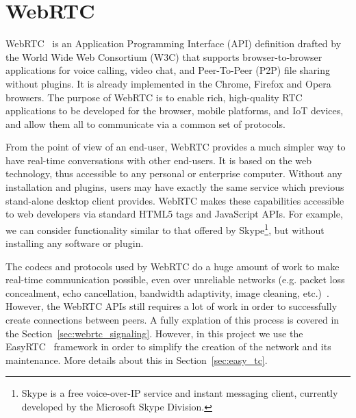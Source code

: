 
\chapter{WebRTC}
\label{cha:webrtc}

WebRTC~\cite{webrtc} is an Application Programming Interface (API) definition drafted by the World Wide Web Consortium (W3C) that supports browser-to-browser applications for voice calling, video chat, and Peer-To-Peer (P2P) file sharing without plugins. It is already implemented in the Chrome, Firefox and Opera browsers. The purpose of WebRTC is to enable rich, high-quality RTC applications to be developed for the browser, mobile platforms, and IoT devices, and allow them all to communicate via a common set of protocols. 

From the point of view of an end-user, WebRTC provides a much simpler way to have real-time conversations with other end-users. It is based on the web technology, thus accessible to any personal or enterprise computer. Without any installation and plugins, users may have exactly the same service which previous stand-alone desktop client provides. WebRTC makes these capabilities accessible to web developers via standard HTML5 tags and JavaScript APIs. For example, we can consider functionality similar to that offered by Skype\footnote{Skype is a free voice-over-IP service and instant messaging client, currently developed by the Microsoft Skype Division.}, but without installing any software or plugin. 

The codecs and protocols used by WebRTC do a huge amount of work to make real-time communication possible, even over unreliable networks (e.g. packet loss concealment, echo cancellation, bandwidth adaptivity, image cleaning, etc.)~\cite{started_with_webrtc}. However, the WebRTC APIs still requires a lot of work in order to successfully create connections between peers. A fully explation of this process is covered in the Section~\ref{sec:webrtc_signaling}. However, in this project we use the EasyRTC~\cite{easyrtc} framework in order to simplify the creation of the network and its maintenance. More details about this in Section~\ref{sec:easy_tc}.

